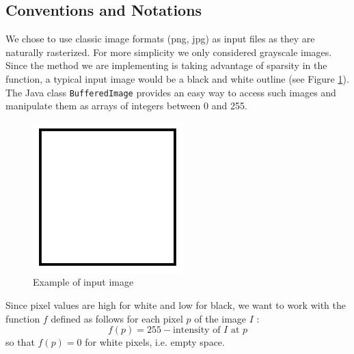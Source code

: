 \documentclass[10pt,a4paper]{article}			%
\begin{document}
	\subsection {Conventions and Notations}
We chose to use classic image formats (png, jpg) as input files as they are naturally rasterized. For more simplicity we only considered grayscale images. Since the method we are implementing is taking advantage of sparsity in the function, a typical input image would be a black and white outline (see Figure \ref{exemple_carre}). The Java class \texttt{BufferedImage} provides an easy way to access such images and manipulate them as arrays of integers between 0 and 255. 
\begin{figure}[h]
\begin{center}
\includegraphics[scale=0.5]{img/carre.png}
\caption{Example of input image}
\label{exemple_carre}
\end{center}
\end{figure}

Since pixel values are high for white and low for black, we want to work with the function $f$ defined as follows for each pixel $p$ of the image $I$ :
\[f(p) = 255 - \text{intensity of $I$ at $p$}\]
so that $f(p)=0$ for white pixels, i.e. empty space.
\end{document}
